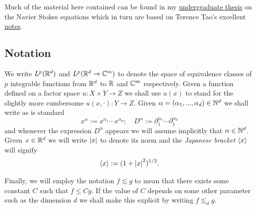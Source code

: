 \documentclass[
    a4paper,
    DIV=14,
    abstract=true,
    numbers=noenddot
]{scrartcl}
\begin{document}
	

	Much of the material here contained can be found in my \href{https://gredos.usal.es/bitstream/handle/10366/145629/TFG%20LIAM%20LLAMAZARES.pdf;jsessionid=CA7AE0CE6BF33CAA6305E55B21A9A1E0?sequence=1}{undergraduate thesis} on the Navier Stokes equations which in turn are based on Terence Tao's excellent \href{https://terrytao.wordpress.com/2018/09/03/254a-notes-0-physical-derivation-of-the-incompressible-euler-and-navier-stokes-equations/}{notes}.

\subsection*{Notation}
We  write $L^p(\mathbb{R}^d)$ and $L^p(\mathbb{R}^d\to\mathbb{C}^m)$ to denote the space of equivalence classes of $p$ integrable functions from $\mathbb{R}^d$ to $\mathbb{R}$ and $\mathbb{C}^m$ respectively.\bigbreak
Given a function defined on a factor space $u:X\times Y\rightarrow Z$ we shall use $u(x)$ to stand for the slightly more cumbersome $u(x,\cdot ):Y\rightarrow Z$.
Given $\alpha=(\alpha_1,...,\alpha_d)\in\mathbb{N}^d$ we shall write as is standard \[x^\alpha:=x^{\alpha_1}\cdots  x^{\alpha_d};\quad D^\alpha:=\partial_1^{\alpha_1}\cdots\partial_1^{\alpha_d}\]
and whenever the expression $D^\alpha$ appears we will assume implicitly that $\alpha\in\mathbb{N}^d$.
Given  $x\in\mathbb{R}^d$ we will write ${\left| x \right|}$ to denote its norm and the \emph{Japanese bracket} $\left\langle x\right\rangle$ will signify
\[\left\langle x\right\rangle:=(1+{\left| x \right|}^2)^{1/2}.\]

Finally, we will employ the notation $f\lesssim g$ to mean that there exists some constant $C$ such that $f\leq Cg$. If the value of $C$ depends on some other parameter such as the dimension $d$ we shall make this explicit by writing $f\lesssim_d g$.\bigbreak
\end{document}
